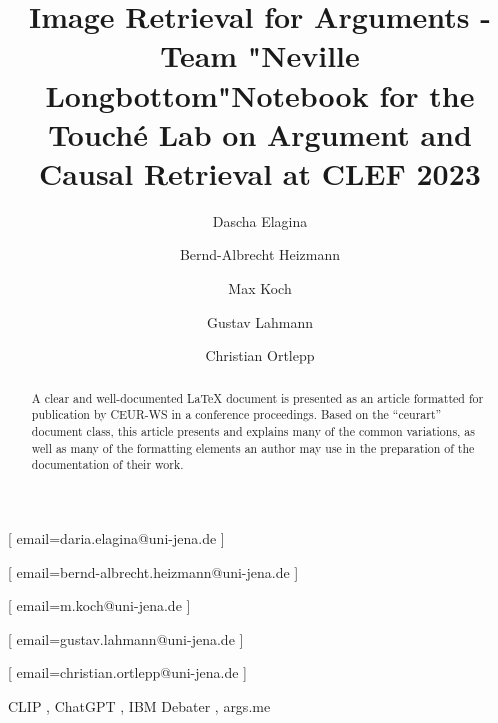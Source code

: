 \documentclass[
]{ceurart}
\begin{document}


\title{Image Retrieval for Arguments - Team "Neville Longbottom"}
\title[mode=sub]{Notebook for the Touch{\'e} Lab on Argument and Causal Retrieval at CLEF 2023}


\author[1]{Dascha Elagina}[%
email=daria.elagina@uni-jena.de
]
\author[1]{Bernd-Albrecht Heizmann}[%
email=bernd-albrecht.heizmann@uni-jena.de
]
\author[1]{Max Koch}[%
email=m.koch@uni-jena.de
]
\author[1]{Gustav Lahmann}[%
email=gustav.lahmann@uni-jena.de
]
\author[1]{Christian Ortlepp}[%
email=christian.ortlepp@uni-jena.de
]


\address[1]{Friedrich-Schiller University Jena,
07743, Jena}


\begin{abstract}
  A clear and well-documented \LaTeX{} document is presented as an
  article formatted for publication by CEUR-WS in a conference
  proceedings. Based on the ``ceurart'' document class, this article
  presents and explains many of the common variations, as well as many
  of the formatting elements an author may use in the preparation of
  the documentation of their work.
\end{abstract}

\begin{keywords}
  CLIP \sep
  ChatGPT \sep
  IBM Debater \sep
  args.me
\end{keywords}

\maketitle
\end{document}
